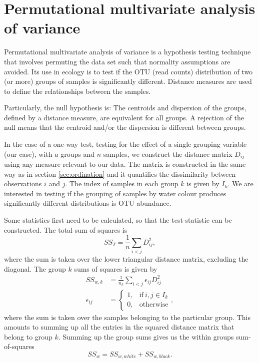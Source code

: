 \section{Permutational multivariate analysis of variance
}
\label{sec:permanova}

Permutational multivariate analysis of variance is a hypothesis testing technique that involves permuting the data set such that normality assumptions are avoided. Its use in ecology is to test if the OTU (read counts) distribution of two (or more) groups of samples is significantly different. Distance measures are used to define the relationships between the samples.

Particularly, the null hypothesis is: The centroids and dispersion of the groups, defined by a distance measure, are equivalent for all groups.
A rejection of the null means that the centroid and/or the dispersion is different between groups.

In the case of a one-way test, testing for the effect of a single grouping variable (our case), with $a$ groups and $n$ samples, we construct the distance matrix $D_{ij}$ using any measure relevant to our data. The matrix is constructed in the same way as in section \ref{sec:ordination} and it quantifies the dissimilarity between observations $i$ and $j$. The index of samples in each group $k$ is given by $I_{k}$. We are interested in testing if the grouping of samples by water colour produces significantly different distributions is OTU abundance.

Some statistics first need to be calculated, so that the test-statistic can be constructed. The total sum of squares is 
\begin{equation}
	SS_T = \frac{1}{n}\sum_{i<j} D_{ij}^2,
\end{equation}
where the sum is taken over the lower triangular distance matrix, excluding the diagonal. The group $k$ sums of squares is given by
\begin{align}
	SS_{w,k} &=\frac{1}{n_k} \sum_{i<j} \epsilon_{ij} D_{ij}^2 \\
	\epsilon_{ij} &=
	 \begin{cases}
	1, & \text{if}\ i,j \in I_{k} \\
	0, & \text{otherwise}
	\end{cases},
\end{align}
where the sum is taken over the samples belonging to the particular group. This amounts to summing up all the entries in the squared distance matrix that belong to group $k$. Summing up the group sums gives us the within groups sum-of-squares
\begin{equation}
	SS_w = SS_{w,white} + SS_{w,black}.
\end{equation}

